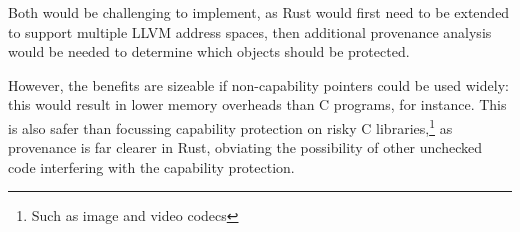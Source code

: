 \documentclass[dissertation.tex]{subfiles}
\begin{document}
Both would be challenging to implement, as Rust would first need to be
extended to support multiple LLVM address spaces, then additional
provenance analysis would be needed to determine which objects should be
protected.

However, the benefits are sizeable if non-capability pointers could be
used widely: this would result in lower memory overheads than C
programs, for instance.
This is also safer than focussing capability protection on risky C
libraries,\footnote{Such as image and video codecs} as provenance is far
clearer in Rust, obviating the possibility of other unchecked code
interfering with the capability protection.
\end{document}
